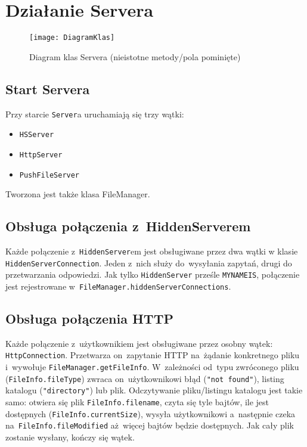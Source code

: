 \documentclass[a4paper,notitlepage]{article}
\begin{document}
\pagestyle{fancy}
\tableofcontents
\section{Działanie Servera}
\begin{figure}
\texttt{[image: DiagramKlas]}
\caption{Diagram klas Servera (nieistotne metody/pola pominięte)}
\end{figure}
\subsection{Start Servera}
Przy starcie \texttt{Server}a uruchamiają się trzy wątki: 
\begin{itemize}
\item \texttt{HSServer}
\item \texttt{HttpServer}
\item \texttt{PushFileServer}
\end{itemize}
Tworzona jest także klasa FileManager.

\subsection{Obsługa połączenia z~HiddenServerem}
Każde połączenie z~\texttt{HiddenServer}em jest obsługiwane przez 
dwa wątki w klasie \texttt{HiddenServerConnection}. Jeden z~nich służy 
do~wysyłania zapytań, drugi do przetwarzania odpowiedzi.
Jak tylko \texttt{HiddenServer} prześle \texttt{MYNAMEIS},
połączenie jest rejestrowane w~\texttt{FileManager.hiddenServerConnections}.

\subsection{Obsługa połączenia HTTP}
Każde połączenie z~użytkownikiem jest obsługiwane przez osobny wątek: 
\texttt{HttpConnection}. Przetwarza on~zapytanie HTTP na~żądanie konkretnego
pliku i~wywołuje \texttt{FileManager.getFileInfo}. W~zależności od~typu 
zwróconego pliku (\texttt{FileInfo.fileType}) zwraca on~użytkownikowi błąd 
(\texttt{"not found"}), listing katalogu (\texttt{"directory"}) lub plik.
Odczytywanie pliku/listingu katalogu jest takie samo:
otwiera się plik \texttt{FileInfo.filename}, czyta się tyle bajtów, ile jest
dostępnych (\texttt{FileInfo.currentSize}), wysyła użytkownikowi a~następnie 
czeka na~\texttt{FileInfo.fileModified} aż~więcej bajtów będzie dostępnych. 
Jak cały plik zostanie wysłany, kończy się wątek.
\end{document}

